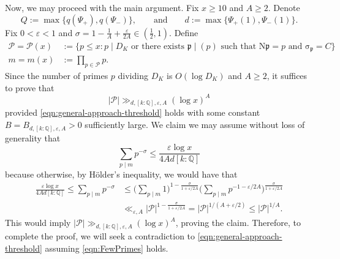 \documentclass[12pt]{amsart}
\theoremstyle{definition} \newtheorem{definition}[theorem]{Definition}
\theoremstyle{example} \newtheorem{example}[theorem]{Example}
\theoremstyle{remark} \newtheorem{remark}{Remark}[theorem]
\numberwithin{equation}{section}
\numberwithin{theorem}{section}
\renewcommand{\epsilon}{\varepsilon}
\renewcommand{\leq}{\leqslant}
\renewcommand{\geq}{\geqslant}
\newcommand{\N}{\mathrm{N}} %
\newcommand{\Q}{\mathbb{Q}}
\newcommand{\kp}{\mathfrak{p}}
\begin{document}
Now, we may proceed with the main argument.
Fix $x \geq 10$ and $A \geq 2$. Denote
\begin{equation} \label{eqn:proof-general-parameters}
Q := \max\{ q(\Psi_+), q(\Psi_-) \}, 
\qquad \text{and} \qquad 
d := \max\{ \Psi_+(1), \Psi_-(1) \}.
\end{equation}
Fix $0 < \epsilon < 1$ and $\sigma = 1 - \frac{1}{A} + \frac{\epsilon}{2A} \in (\frac{1}{2},1)$. Define
\begin{equation}
\begin{aligned}
\mathcal{P} = \mathcal{P}(x) &  := \{ p \leq x : p \mid D_K \text{ or there exists $\kp \mid (p)$ such that $\N\kp = p$ and } \mathrm{\sigma}_{\kp} =  C  \}  \\ 
m = m(x) & := \prod_{p \in \mathcal{P}} p.  	
\end{aligned}
\label{eqn:proof-bad-primes}
\end{equation}
Since the number of primes $p$ dividing $D_K$ is $O(\log D_K)$ and $A \geq 2$, it suffices to prove that 
\[
\mathcal{|P|} \gg_{d,[k:\Q],\epsilon,A} (\log x)^A
\]
 provided \eqref{eqn:general-approach-threshold} holds with some constant $B = B_{d,[k:\Q],\epsilon,A} > 0$ sufficiently large. We claim we may assume without loss of generality that
\begin{equation} \label{eqn:FewPrimes}
\sum_{p \mid m} p^{-\sigma} \leq   \frac{\epsilon \log x}{4 A d [k:\Q]}
\end{equation}
because otherwise, by H\"{o}lder's inequality, we would have that 
\begin{align*}
\frac{\epsilon \log x}{4 A d [k:\Q]} \leq \sum_{p \mid m} p^{-\sigma} 
& \leq \Big( \sum_{p \mid m} 1 \Big)^{1-\frac{\sigma}{1+\epsilon/2A}} \Big( \sum_{p \mid m} p^{-1-\epsilon/2A} \Big)^{\frac{\sigma}{1+\epsilon/2A}}  \\
& \ll_{\epsilon,A} |\mathcal{P}|^{1-\frac{\sigma}{1+\epsilon/2A}}  = |\mathcal{P}|^{1/(A+\epsilon/2)} \leq |\mathcal{P}|^{1/A}.
\end{align*}
This would imply $|\mathcal{P}| \gg_{d,[k:\Q],\epsilon,A} (\log x)^{A}$, proving the claim.  Therefore, to complete the proof, we will seek a contradiction to \eqref{eqn:general-approach-threshold} assuming \eqref{eqn:FewPrimes} holds. 
\end{document}
